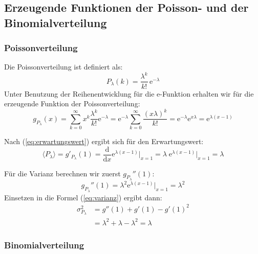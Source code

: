 \documentclass[a4paper]{article}
\newcommand{\dx}{\frac{\mathrm{d}}{\mathrm{d}x}}
\begin{document}
\newpage
\subsection{Erzeugende Funktionen der Poisson- und der Binomialverteilung}
\subsubsection{Poissonverteilung}
Die Poissonverteilung ist definiert als:
\begin{equation}
    P_\lambda (k) = \frac{\lambda^k}{k!}\, \mathrm{e}^{-\lambda}
\end{equation}
Unter Benutzung der Reihenentwicklung für die e-Funktion erhalten wir
für die erzeugende Funktion der Poissonverteilung:
\begin{equation}
    g_{P_\lambda}(x) = \sum_{k=0}^\infty x^k \frac{\lambda^k}{k!} \mathrm{e}^{-\lambda}
                     = \mathrm{e}^{-\lambda} \sum_{k=0}^\infty \frac{(x\lambda)^k}{k!}
                     = \mathrm{e}^{-\lambda} \mathrm{e}^{x\lambda}
                     = \mathrm{e}^{\lambda (x-1)}
\end{equation}

Nach (\ref{eq:erwartungswert}) ergibt sich für den Erwartungswert:
\begin{equation}
    \langle P_\lambda \rangle = g'_{P_\lambda}(1)
    = \dx \mathrm{e}^{\lambda (x-1)} \Big|_{x=1}
    = \lambda \; \mathrm{e}^{\lambda (x-1)} \Big|_{x=1}
    = \lambda
\end{equation}

Für die Varianz berechnen wir zuerst $g_{P_\lambda}''(1)$:
\begin{equation}
    g_{P_\lambda}''(1) = \lambda^2 \mathrm{e}^{\lambda (x-1)} \Big|_{x=1}
                       = \lambda^2
\end{equation}
Einsetzen in die Formel (\ref{eq:varianz}) ergibt dann:
\begin{align*}
    \sigma_{P_\lambda}^2 &= g''(1) + g'(1) - g'(1)^2 \\
                         &= \lambda^2 + \lambda - \lambda^2 = \lambda
\end{align*}

\subsubsection{Binomialverteilung}
\end{document}
